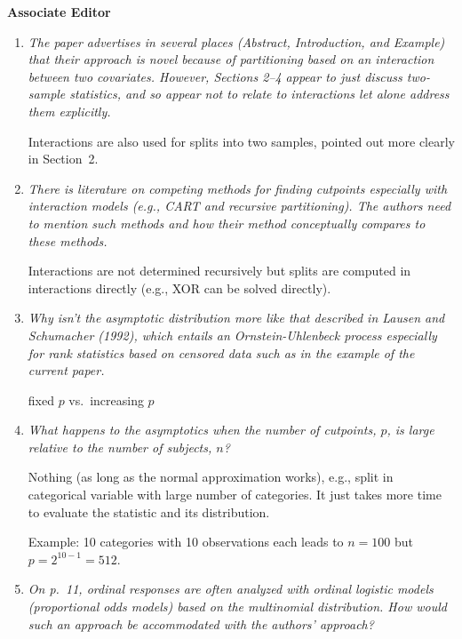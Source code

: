 \documentclass[11pt,a4paper]{article}
\begin{document}
\textbf{\large Associate Editor}

\begin{enumerate}

  \item \textit{The paper advertises in several places (Abstract,
        Introduction, and Example) that their approach is novel because
	of partitioning based on an interaction between two covariates.
	However, Sections 2--4 appear to just discuss two-sample statistics,
	and so appear not to relate to interactions let alone address them
	explicitly.}
	
	Interactions are also used for splits into two samples, pointed
	out more clearly in Section~2.
	
  \item \textit{There is literature on competing methods for finding cutpoints
        especially with interaction models (e.g., CART and recursive partitioning).
	The authors need to mention such methods and how their method conceptually
	compares to these methods.}
	
	Interactions are not determined recursively but splits are computed in
	interactions directly (e.g., XOR can be solved directly).

  \item \textit{Why isn't the asymptotic distribution more like that described
        in Lausen and Schumacher (1992), which entails an Ornstein-Uhlenbeck process
	especially for rank statistics based on censored data such as in the example
	of the current paper.}
	
	fixed $p$ vs.\ increasing $p$
	
  \item \textit{What happens to the asymptotics when the number of cutpoints, $p$,
        is large relative to the number of subjects, $n$?}
	
	Nothing (as long as the normal approximation works), e.g., split in
	categorical variable with large number of categories. It just takes more
	time to evaluate the statistic and its distribution.
	
	Example: 10 categories with 10 observations each leads to $n = 100$ but
	$p = 2^{10 - 1} = 512$.
	
  \item \textit{On p.~11, ordinal responses are often analyzed with ordinal
        logistic models (proportional odds models) based on the multinomial
	distribution. How would such an approach be accommodated with the
	authors' approach?}
	

\end{enumerate}
\end{document}
